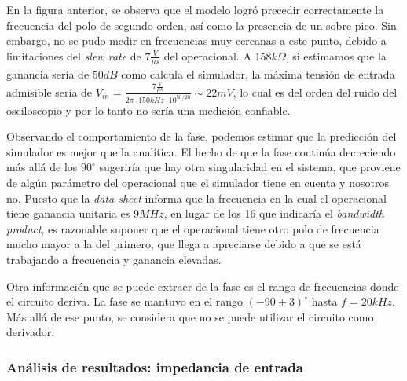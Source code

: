 \documentclass[../../main.tex]{subfiles}
\begin{document}
En la figura anterior, se observa que el modelo logr\'o precedir correctamente la frecuencia del polo de segundo orden, as\'i como la presencia de un sobre pico. Sin embargo, no se pudo medir en frecuencias muy cercanas a este punto, debido a limitaciones del \textit{slew rate} de $7\frac{V}{\mu s}$ del operacional. A $158k\Omega$, si estimamos que la ganancia ser\'ia de $50dB$ como calcula el simulador, la m\'axima tensi\'on de entrada admisible ser\'ia de $V_{in} = \frac{7\frac{V}{\mu s}}{2\pi \cdot 150kHz \cdot 10^{50/20}}\sim 22mV$, lo cual es del orden del ruido del osciloscopio y por lo tanto no ser\'ia una medici\'on confiable.\par

Observando el comportamiento de la fase, podemos estimar que la predicci\'on del simulador es mejor que la anal\'itica. El hecho de que la fase contin\'ua decreciendo m\'as all\'a de los $90^\circ$ sugerir\'ia que hay otra singularidad en el sistema, que proviene de alg\'un par\'ametro del operacional que el simulador tiene en cuenta y nosotros no. Puesto que la \textit{data sheet} informa que la frecuencia en la cual el operacional tiene ganancia unitaria es $9MHz$, en lugar de los 16 que indicar\'ia el \textit{bandwidth product}, es razonable suponer que el operacional tiene otro polo de frecuencia mucho mayor a la del primero, que llega a apreciarse debido a que se est\'a trabajando a frecuencia y ganancia elevadas.\par 

Otra informaci\'on que se puede extraer de la fase es el rango de frecuencias donde el circuito deriva. La fase se mantuvo en el rango $(-90\pm 3)^\circ$ hasta $f = 20kHz$. M\'as all\'a de ese punto, se considera que no se puede utilizar el circuito como derivador. 



\subsubsection{An\'alisis de resultados: impedancia de entrada}
\end{document}
